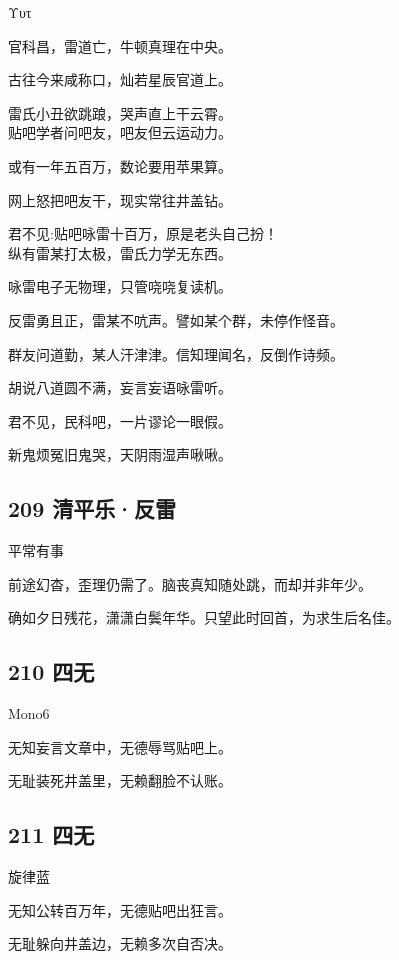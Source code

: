 Υυτ

官科昌，雷道亡，牛顿真理在中央。

古往今来咸称口，灿若星辰官道上。

雷氏小丑欲跳踉，哭声直上干云霄。 ~\\
贴吧学者问吧友，吧友但云运动力。

或有一年五百万，数论要用苹果算。

网上怒把吧友干，现实常往井盖钻。

君不见:贴吧咏雷十百万，原是老头自己扮！ ~\\
纵有雷某打太极，雷氏力学无东西。

咏雷电子无物理，只管哓哓复读机。

反雷勇且正，雷某不吭声。譬如某个群，未停作怪音。

群友问道勤，某人汗津津。信知理闻名，反倒作诗频。

胡说八道圆不满，妄言妄语咏雷听。

君不见，民科吧，一片谬论一眼假。

新鬼烦冤旧鬼哭，天阴雨湿声啾啾。

\hypertarget{ux6e05ux5e73ux4e50ux53cdux96f7}{%
\subsection{209 清平乐·反雷}\label{ux6e05ux5e73ux4e50ux53cdux96f7}}

平常有事

前途幻杳，歪理仍需了。脑丧真知随处跳，而却并非年少。

确如夕日残花，潇潇白鬓年华。只望此时回首，为求生后名佳。

\hypertarget{ux56dbux65e0}{%
\subsection{210 四无}\label{ux56dbux65e0}}

Mono6

无知妄言文章中，无德辱骂贴吧上。

无耻装死井盖里，无赖翻脸不认账。

\hypertarget{ux56dbux65e0-1}{%
\subsection{211 四无}\label{ux56dbux65e0-1}}

旋律蓝

无知公转百万年，无德贴吧出狂言。

无耻躲向井盖边，无赖多次自否决。

